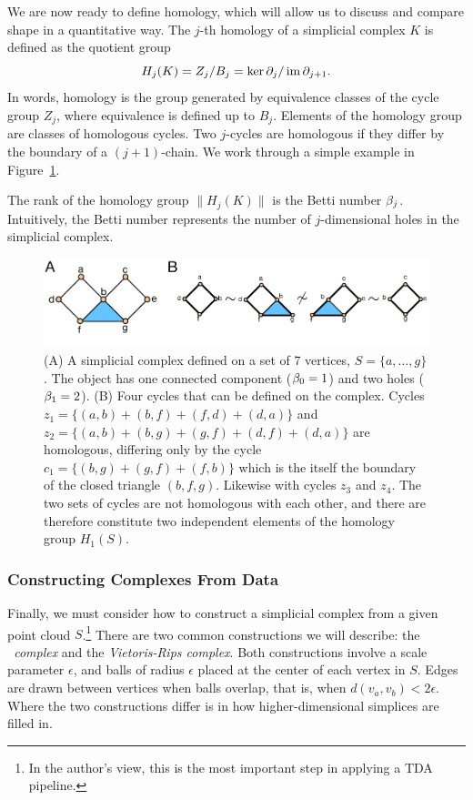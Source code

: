 We are now ready to define homology, which will allow us to discuss and compare shape in a quantitative way.
The $j$-th homology of a simplicial complex $K$ is defined as the quotient group
\begin{equation}
H_{j}(K) = Z_{j} / B_{j} = \ker\partial_{j} / \operatorname{im}\partial_{j+1}.
\end{equation}
In words, homology is the group generated by equivalence classes of the cycle group $Z_{j}$, where equivalence is defined up to $B_{j}$.
Elements of the homology group are classes of homologous cycles.
Two $j$-cycles are homologous if they differ by the boundary of a $(j+1)$-chain.
We work through a simple example in Figure~\ref{fig:bg:homology_example}.

The rank of the homology group $\|H_{j}(K)\|$ is the Betti number $\beta_j$.
Intuitively, the Betti number represents the number of $j$-dimensional holes in the simplicial complex.

\begin{figure}
\centering
\includegraphics[]{./fig/background/homology_example.pdf}
\caption[Simplicial Homology]{(A) A simplicial complex defined on a set of 7 vertices, $S=\{a,\ldots,g\}$. The object has one connected component ($\beta_0=1$) and two holes ($\beta_1=2$). (B) Four cycles that can be defined on the complex. Cycles $z_1=\{(a,b)+(b,f)+(f,d)+(d,a)\}$ and $z_2=\{(a,b)+(b,g)+(g,f)+(d,f)+(d,a)\}$ are homologous, differing only by the cycle $c_1=\{(b,g)+(g,f)+(f,b)\}$ which is the itself the boundary of the closed triangle $(b,f,g)$. Likewise with cycles $z_3$ and $z_4$. The two sets of cycles are not homologous with each other, and there are therefore constitute two independent elements of the homology group $H_1(S)$.}
\label{fig:bg:homology_example}
\end{figure}

\subsubsection{Constructing Complexes From Data}
\label{bg:tda:math:complexes}

Finally, we must consider how to construct a simplicial complex from a given point cloud $S$.\footnote{In the author's view, this is the most important step in applying a TDA pipeline.}
There are two common constructions we will describe: the \emph{\Cech\ complex} and the \emph{Vietoris-Rips complex}.
Both constructions involve a scale parameter $\epsilon$, and balls of radius $\epsilon$ placed at the center of each vertex in $S$.
Edges are drawn between vertices when balls overlap, that is, when $d(v_{a},v_{b})<2\epsilon$.
Where the two constructions differ is in how higher-dimensional simplices are filled in.

